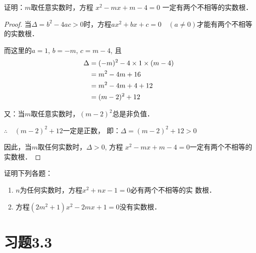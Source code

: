 \begin{example}
    证明：$m$取任意实数时，方程
$x^2-mx+m-4=0$
一定有两个不相等的实数根．
\end{example}

\begin{proof}
 当$\Delta =b^2-4ac>0$时，方程$ax^2+bx+c=0\quad (a\ne 0)$才能有两个不相等的实数根．

而这里的$a=1$, $b=-m$, $c=m-4$, 
且
\[\begin{split}
    \Delta &=(-m)^2-4\times1\times(m-4)\\
&=m^2-4m+16\\
&=m^2-4m+4+12\\
&=(m-2)^2+12\\
\end{split}\]

又：当$m$取任意实数时，$(m-2)^2$总是非负值．

$\therefore\quad (m-2)^2+12$一定是正数，
即：$\Delta =(m-2)^2+12>0$

因此，当$m$取任何实数时，$\Delta >0$, 方程   
$x^2-mx+m-4=0$一定有两个不相等的实数根．
\end{proof}


\begin{ex}
    证明下列各题：
\begin{enumerate}
    \item $n$为任何实数时，方程$x^2+nx-1=0$必有两个不相等的实
    数根．
    \item 方程$(2m^2+1)x^2-2mx+1=0$没有实数根．
\end{enumerate}
\end{ex}

\section*{习题3.3}

